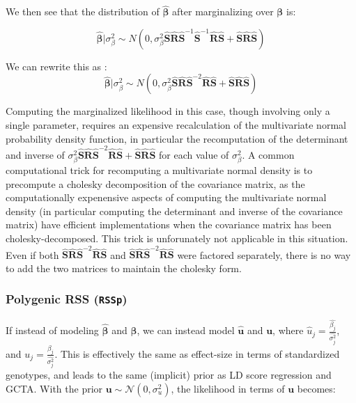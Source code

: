 We then see that the distribution of \(\hat{\boldsymbol{\beta}}\) after marginalizing over $\boldsymbol{\beta}$ is:

$$ \hat{\boldsymbol{\beta}}|\sigma_\beta^2 \sim N(0,\sigma_\beta^2\hat{\textbf{S}}\hat{\textbf{R}}\hat{\textbf{S}}^{-1}\hat{\textbf{S}}^{-1}\hat{\textbf{R}}\hat{\textbf{S}}+\hat{\textbf{S}}\hat{\textbf{R}}\hat{\textbf{S}})$$ 

We can rewrite this as :
$$\hat{\boldsymbol{\beta}}|\sigma_\beta^2 \sim  N(0,\sigma_\beta^2\hat{\textbf{S}}\hat{\textbf{R}}\hat{\textbf{S}}^{-2}\hat{\textbf{R}}\hat{\textbf{S}}+\hat{\textbf{S}}\hat{\textbf{R}}\hat{\textbf{S}}) $$

Computing the marginalized likelihood in this case, though involving only a single parameter, requires an expensive recalculation of the multivariate normal probability density function, in particular 
the recomputation of the determinant and inverse of \(\sigma_\beta^2\hat{\textbf{S}}\hat{\textbf{R}}\hat{\textbf{S}}^{-2}\hat{\textbf{R}}\hat{\textbf{S}}+\hat{\textbf{S}}\hat{\textbf{R}}\hat{\textbf{S}}\) for each value of 
\(\sigma_\beta^2\).  A common computational trick for recomputing a multivariate normal density is to precompute a cholesky decomposition of the covariance matrix, as the computationally expenensive aspects of computing the multivariate normal density (in particular computing the determinant and inverse of the covariance matrix) have efficient implementations when the covariance matrix has been cholesky-decomposed.  This trick is unforunately not applicable in this situation.  Even if both $\hat{\textbf{S}}\hat{\textbf{R}}\hat{\textbf{S}}^{-2}\hat{\textbf{R}}\hat{\textbf{S}}$ and $\hat{\textbf{S}}\hat{\textbf{R}}\hat{\textbf{S}}^{-2}\hat{\textbf{R}}\hat{\textbf{S}}$ were factored separately, there is no way to add the two matrices to maintain the cholesky form.


\subsubsection{Polygenic RSS (\texttt{RSSp})}\label{sec:org040cb73}

If instead of modeling \(\hat{\boldsymbol{\beta}}\) and \(\boldsymbol{\beta}\), we can instead model $\hat{\textbf{u}}$ and $\textbf{u}$, where $\hat{u}_j=\frac{\hat{\beta_j}}{\hat{\sigma_j^2}}$, and  \(u_j=\frac{\beta_j}{\hat{\sigma_j^2}}\).  This is effectively the same as effect-size in terms of standardized genotypes, and leads to the same (implicit) prior as LD score regression\cite{ldsc} and GCTA\cite{GCTA}.  With the prior $\textbf{u} \sim \mathcal{N}(0,\sigma_u^2)$, the likelihood in terms of $\textbf{u}$ becomes:

